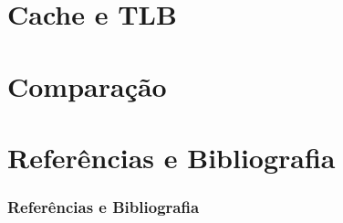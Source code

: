 \documentclass[10pt]{beamer}
\theoremstyle{plain}
\begin{document}
\section{Cache e TLB}

\section{Comparação}


\section[Referências]{Referências e Bibliografia}
\begin{frame}[t,allowframebreaks]
  \frametitle{Referências e Bibliografia}
  \footnotesize
  \nocite{*}
  \printbibliography[]
\end{frame}
\end{document}
